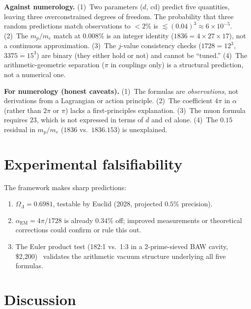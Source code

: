 \documentclass[aps,prl,twocolumn,superscriptaddress,nofootinbib]{revtex4-2}
\newcommand{\cd}{\mathrm{cd}}
\begin{document}
\textbf{Against numerology.}
(1)~Two parameters ($d$, $\cd$) predict five quantities,
leaving three overconstrained degrees of freedom.
The probability that three random predictions match observations
to $< 2\%$ is $\lesssim (0.04)^3 \approx 6 \times 10^{-5}$.
(2)~The $m_p/m_e$ match at 0.008\% is an integer identity
($1836 = 4 \times 27 \times 17$), not a continuous approximation.
(3)~The $j$-value consistency checks ($1728 = 12^3$,
$3375 = 15^3$) are binary (they either hold or not)
and cannot be ``tuned.''
(4)~The arithmetic-geometric separation ($\pi$ in couplings
only) is a structural prediction, not a numerical one.

\textbf{For numerology (honest caveats).}
(1)~The formulas are \emph{observations}, not derivations
from a Lagrangian or action principle.
(2)~The coefficient $4\pi$ in $\alpha$ (rather than $2\pi$
or $\pi$) lacks a first-principles explanation.
(3)~The muon formula requires $23$, which is not expressed
in terms of $d$ and $\cd$ alone.
(4)~The $0.15$ residual in $m_p/m_e$ ($1836$ vs.\ $1836.153$)
is unexplained.

\section{Experimental falsifiability}

The framework makes sharp predictions:
\begin{enumerate}
\item $\Omega_\Lambda = 0.6981$, testable by Euclid (2028,
  projected $0.5\%$ precision).
\item $\alpha_{\mathrm{EM}} = 4\pi/1728$ is already $0.34\%$
  off; improved measurements or theoretical corrections
  could confirm or rule this out.
\item The Euler product test (182:1 vs.\ 1:3 in a 2-prime-sieved
  BAW cavity, \$2{,}200)~\cite{WB_spectral_warp}
  validates the arithmetic vacuum structure underlying all five
  formulas.
\end{enumerate}

\section{Discussion}
\end{document}
